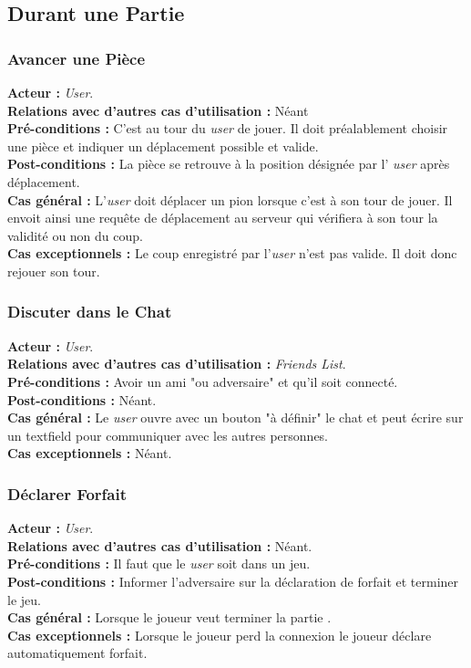 \documentclass[10pt, a4paper]{article}
\begin{document}
\subsection{Durant une Partie}

\subsubsection{Avancer une Pièce}
\textbf{Acteur :} \textit{User}.\\
\textbf{Relations avec d'autres cas d'utilisation :} Néant \\
\textbf{Pré-conditions :} C'est au tour du \textit{user} de jouer. Il doit préalablement choisir une pièce et indiquer un déplacement possible et valide. \\
\textbf{Post-conditions :} La pièce se retrouve à la position désignée par l' \textit{user} après déplacement. \\
\textbf{Cas général :} L'\textit{user} doit déplacer un pion lorsque c'est à son tour de jouer. Il envoit ainsi une requête de déplacement au serveur qui vérifiera à son tour la validité ou non du coup. \\
\textbf{Cas exceptionnels :} Le coup enregistré par l'\textit{user} n'est pas valide. Il doit donc rejouer son tour. \\

\subsubsection{Discuter dans le Chat}
\textbf{Acteur :} \textit{User}.\\
\textbf{Relations avec d'autres cas d'utilisation :} \textit{Friends List}.\\
\textbf{Pré-conditions :} Avoir un ami "ou adversaire" et qu'il soit connecté.\\ %
\textbf{Post-conditions :} Néant.\\
\textbf{Cas général :} Le \textit{user} ouvre avec un bouton "à définir" le chat et peut écrire sur un textfield pour communiquer avec les autres personnes.\\ %
\textbf{Cas exceptionnels :} Néant.

\subsubsection{Déclarer Forfait}
\textbf{Acteur :} \textit{User}.\\
\textbf{Relations avec d'autres cas d'utilisation :} Néant.\\
\textbf{Pré-conditions :} Il faut que le \textit{user} soit dans un jeu. \\
\textbf{Post-conditions :} Informer l'adversaire sur la déclaration de forfait et terminer le jeu.\\
\textbf{Cas général :} Lorsque le joueur veut terminer la partie .\\
\textbf{Cas exceptionnels :} Lorsque le joueur perd la connexion le joueur déclare automatiquement forfait. %
\end{document}
